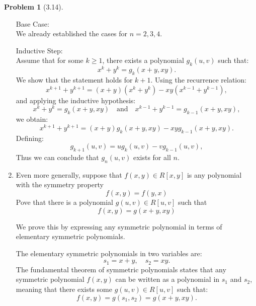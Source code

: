 \documentclass[12pt]{article}
\theoremstyle{definition}
\newtheorem{problem}{Problem}
\begin{document}
\begin{problem}[3.14]
\begin{enumerate}[label=(\alph*)]
        \begin{solution}
            Base Case:\\
            We already established the cases for \( n = 2, 3, 4 \).
    
            Inductive Step:\\
            Assume that for some \( k \geq 1 \), there exists a polynomial \( g_k(u, v) \) such that:
            \[
                x^k + y^k = g_k(x + y, xy).
            \]
            We show that the statement holds for \( k+1 \). Using the recurrence relation:
            \[
                x^{k+1} + y^{k+1} = (x + y)(x^k + y^k) - xy(x^{k-1} + y^{k-1}),
            \]
            and applying the inductive hypothesis:
            \[
                x^k + y^k = g_k(x + y, xy) \quad \text{and} \quad x^{k-1} + y^{k-1} = g_{k-1}(x + y, xy),
            \]
            we obtain:
            \[
                x^{k+1} + y^{k+1} = (x + y) g_k(x + y, xy) - xy g_{k-1}(x + y, xy).
            \]
            Defining:
            \[
                g_{k+1}(u, v) = u g_k(u, v) - v g_{k-1}(u, v),
            \]
            Thus we can conclude that \( g_n(u, v) \) exists for all \( n \).
            
        \end{solution}
        \item Even more generally, suppose that $f(x, y) \in R[x, y]$ is any polynomial with the symmetry property
        \[
            f(x, y) = f(y, x)
        \]
        Pove that there is a polynomial $g(u, v) \in R[u, v]$ such that
        \[
            f(x, y) = g(x + y, xy)
        \]
        \begin{solution}
            We prove this by expressing any symmetric polynomial in terms of elementary symmetric polynomials.

            The elementary symmetric polynomials in two variables are:
            \[
                s_1 = x + y, \quad s_2 = xy.
            \]
            The fundamental theorem of symmetric polynomials states that any symmetric polynomial \( f(x, y) \) can be written as a polynomial in \( s_1 \) and \( s_2 \), meaning that there exists some \( g(u, v) \in R[u, v] \) such that:
            \[
                f(x, y) = g(s_1, s_2) = g(x + y, xy).
            \]  
        \end{solution}
    \end{enumerate}
\end{problem}
\end{document}
